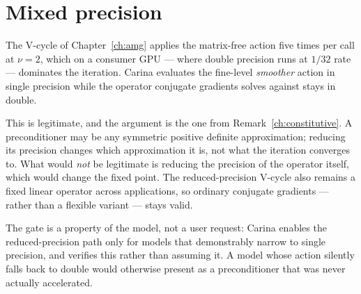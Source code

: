 \section{Mixed precision}
\label{sec:mixed-precision}

The V-cycle of Chapter~\ref{ch:amg} applies the matrix-free action five times
per call at $\nu = 2$, which on a consumer GPU --- where double precision runs
at $1/32$ rate --- dominates the iteration.  Carina evaluates the fine-level
\emph{smoother} action in single precision while the operator conjugate
gradients solves against stays in double.

This is legitimate, and the argument is the one from
Remark~\ref{ch:constitutive}.  A preconditioner may be any symmetric positive
definite approximation; reducing its precision changes which approximation it
is, not what the iteration converges to.  What would \emph{not} be legitimate
is reducing the precision of the operator itself, which would change the fixed
point.  The reduced-precision V-cycle also remains a fixed linear operator
across applications, so ordinary conjugate gradients --- rather than a flexible
variant --- stays valid.

The gate is a property of the model, not a user request: Carina enables the
reduced-precision path only for models that demonstrably narrow to single
precision, and verifies this rather than assuming it.  A model whose action
silently falls back to double would otherwise present as a preconditioner that
was never actually accelerated.
